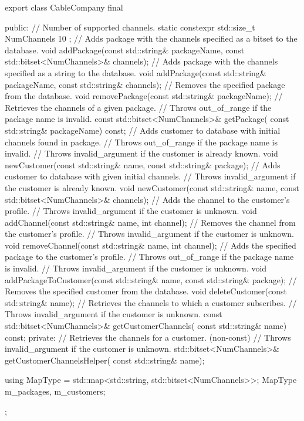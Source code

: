\begin{cpp}
export class CableCompany final
{
    public:
    // Number of supported channels.
    static constexpr std::size_t NumChannels { 10 };
    // Adds package with the channels specified as a bitset to the database.
    void addPackage(const std::string& packageName,
        const std::bitset<NumChannels>& channels);
    // Adds package with the channels specified as a string to the database.
    void addPackage(const std::string& packageName,
        const std::string& channels);
    // Removes the specified package from the database.
    void removePackage(const std::string& packageName);
    // Retrieves the channels of a given package.
    // Throws out_of_range if the package name is invalid.
    const std::bitset<NumChannels>& getPackage(
    const std::string& packageName) const;
    // Adds customer to database with initial channels found in package.
    // Throws out_of_range if the package name is invalid.
    // Throws invalid_argument if the customer is already known.
    void newCustomer(const std::string& name, const std::string& package);
    // Adds customer to database with given initial channels.
    // Throws invalid_argument if the customer is already known.
    void newCustomer(const std::string& name,
        const std::bitset<NumChannels>& channels);
    // Adds the channel to the customer's profile.
    // Throws invalid_argument if the customer is unknown.
    void addChannel(const std::string& name, int channel);
    // Removes the channel from the customer's profile.
    // Throws invalid_argument if the customer is unknown.
    void removeChannel(const std::string& name, int channel);
    // Adds the specified package to the customer's profile.
    // Throws out_of_range if the package name is invalid.
    // Throws invalid_argument if the customer is unknown.
    void addPackageToCustomer(const std::string& name,
    const std::string& package);
    // Removes the specified customer from the database.
    void deleteCustomer(const std::string& name);
    // Retrieves the channels to which a customer subscribes.
    // Throws invalid_argument if the customer is unknown.
    const std::bitset<NumChannels>& getCustomerChannels(
        const std::string& name) const;
    private:
        // Retrieves the channels for a customer. (non-const)
        // Throws invalid_argument if the customer is unknown.
        std::bitset<NumChannels>& getCustomerChannelsHelper(
            const std::string& name);

        using MapType = std::map<std::string, std::bitset<NumChannels>>;
        MapType m_packages, m_customers;
};
\end{cpp}

